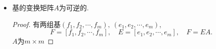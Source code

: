 \begin{itemize}
\begin{proof}
      根据基的定义, $(f_1,f_2,\cdots,f_n)$可以写成$e_1,e_2,\cdots,e_m$的线性组合.
      \begin{equation}
        \begin{matrix}
          f_1 = a_{11}e_1
          + \cdots a_{m1} e_m
          \\
          \vdots
          \\
          f_n = a_{1n}e_1
          + \cdots a_{mn} e_m
        \end{matrix}
      \end{equation}
      把上述过程写成矩阵乘法的形式
      \begin{equation}
        F = \begin{bmatrix} f_1, f_2, \cdots, f_n \end{bmatrix},\quad E = \begin{bmatrix} e_1, e_2, \cdots, e_m \end{bmatrix}
      \end{equation}
      并且
      \begin{equation}
        F = EA,
      \end{equation}
      其中$A = (a_{ij})$, $A$为一个$m \times n$的矩阵.
  
      考虑$Ax = 0$的解, 利用之前齐次线性方程组的解的性质, 参数个数为$(n-r)$, $r$为主元数目, 且$r \le m$.
      所以$Ax=0$一定有非$0$的解($m\neq n$).
  
      利用方程$F=EA$, 如果$Ax=0$有非零解, 那么
      \begin{equation}
        Fx=EAx = 0
      \end{equation}
      也有非零解, 和假设矛盾.
  \end{proof}

  \item 基的变换矩阵$A$为可逆的.
  \begin{proof}
      有两组基$(f_1,f_2,\cdots,f_m), \ (e_1,e_2,\cdots,e_m)$, 
      \begin{equation}
        F = [f_1,f_2,\cdots,f_m], \quad E = [e_1,e_2,\cdots,e_m], \quad F=EA.
      \end{equation}
      $A$为$m \times m$
  \end{proof}
\end{itemize}

